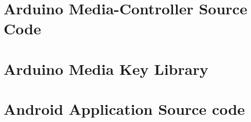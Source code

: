 \documentclass{article}
\begin{document}
	\begin{appendices}

		\section{Arduino Media-Controller Source Code}
			
			\newpage
			
		\section{Arduino Media Key Library}
			
			\newpage
			
			\newpage
			
		\section{Android Application Source code}
			
			\newpage
			
			
			\newpage
					
		
		
		\newpage
	
		
		
		\newpage	

		 		
	\end{appendices}
\end{document}
